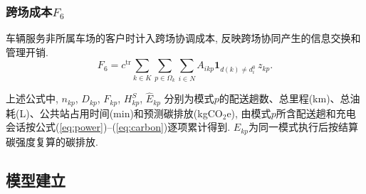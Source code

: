 \documentclass{setp-new}
\begin{document}
\subsubsection{跨场成本\texorpdfstring{$F_6$}{F6}}
车辆服务非所属车场的客户时计入跨场协调成本,
反映跨场协同产生的信息交换和管理开销.
\begin{equation}
F_6=c^{\mathrm{tr}}\sum_{k\in K}\sum_{p\in\Omega_k}\sum_{i\in N}A_{ikp}\mathbf 1_{d(k)\neq d_i^0}\,z_{kp}.
\label{eq:F6}
\end{equation}

上述公式中, $n_{kp}$, $D_{kp}$, $F_{kp}$, $H_{kp}^{S}$, $\widehat E_{kp}$
分别为模式$p$的配送趟数、总里程(km)、总油耗(L)、公共站占用时间(min)和预测碳排放(kgCO$_2$e),
由模式$p$所含配送趟和充电会话按公式(\ref{eq:power})--(\ref{eq:carbon})逐项累计得到.
$E_{kp}$为同一模式执行后按结算碳强度复算的碳排放.

\subsection{模型建立}
\end{document}
